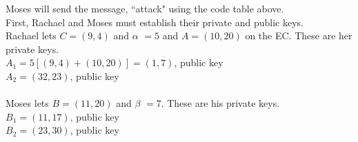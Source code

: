 \begin{eg} Moses will send the message, ``attack" using the code table above.\\
First, Rachael and Moses must establish their private and public keys.\\
Rachael lets $C = (9,4)$ and $\alpha$ $= 5$ and $A = (10, 20)$ on the EC. These are her private keys.\\
	$A_1 = 5[(9, 4) + (10, 20)] = (1, 7)$, public key\\
	$A_2 = (32, 23)$, public key\\ \\
Moses lets $B = (11, 20)$ and $\beta$ $= 7$. These are his private keys. \\
	$B_1 = (11, 17)$, public key\\
	$B_2 = (23, 30)$, public key


\end{eg}
